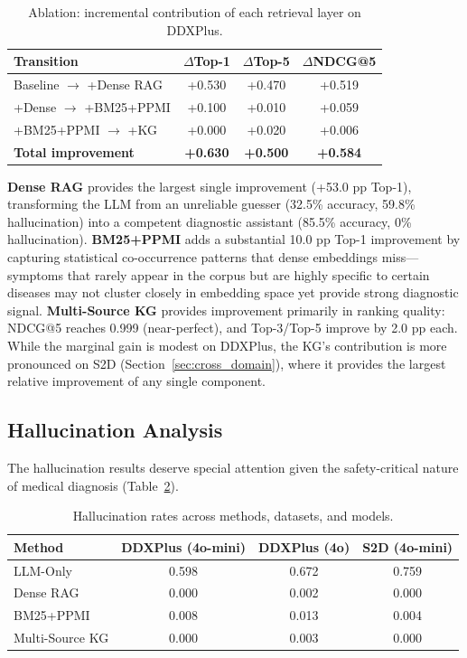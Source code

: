 \documentclass[preprint,12pt]{elsarticle}
\begin{document}
\begin{table}[t]
\centering
\caption{Ablation: incremental contribution of each retrieval layer on DDXPlus.}
\label{tab:ablation}
\begin{tabular}{lccc}
\toprule
\textbf{Transition} & \textbf{$\Delta$Top-1} & \textbf{$\Delta$Top-5} & \textbf{$\Delta$NDCG@5} \\
\midrule
Baseline $\to$ +Dense RAG    & +0.530 & +0.470 & +0.519 \\
+Dense $\to$ +BM25+PPMI      & +0.100 & +0.010 & +0.059 \\
+BM25+PPMI $\to$ +KG         & +0.000 & +0.020 & +0.006 \\
\midrule
\textbf{Total improvement}   & \textbf{+0.630} & \textbf{+0.500} & \textbf{+0.584} \\
\bottomrule
\end{tabular}
\end{table}

\textbf{Dense RAG} provides the largest single improvement (+53.0 pp Top-1), transforming the LLM from an unreliable guesser (32.5\% accuracy, 59.8\% hallucination) into a competent diagnostic assistant (85.5\% accuracy, 0\% hallucination). \textbf{BM25+PPMI} adds a substantial 10.0 pp Top-1 improvement by capturing statistical co-occurrence patterns that dense embeddings miss---symptoms that rarely appear in the corpus but are highly specific to certain diseases may not cluster closely in embedding space yet provide strong diagnostic signal. \textbf{Multi-Source KG} provides improvement primarily in ranking quality: NDCG@5 reaches 0.999 (near-perfect), and Top-3/Top-5 improve by 2.0 pp each. While the marginal gain is modest on DDXPlus, the KG's contribution is more pronounced on S2D (Section~\ref{sec:cross_domain}), where it provides the largest relative improvement of any single component.

\subsection{Hallucination Analysis}
\label{sec:hallucination}

The hallucination results deserve special attention given the safety-critical nature of medical diagnosis (Table~\ref{tab:halluc}).

\begin{table}[t]
\centering
\caption{Hallucination rates across methods, datasets, and models.}
\label{tab:halluc}
\begin{tabular}{lccc}
\toprule
\textbf{Method} & \textbf{DDXPlus (4o-mini)} & \textbf{DDXPlus (4o)} & \textbf{S2D (4o-mini)} \\
\midrule
LLM-Only        & 0.598 & 0.672 & 0.759 \\
Dense RAG        & 0.000 & 0.002 & 0.000 \\
BM25+PPMI        & 0.008 & 0.013 & 0.004 \\
Multi-Source KG  & 0.000 & 0.003 & 0.000 \\
\bottomrule
\end{tabular}
\end{table}
\end{document}

